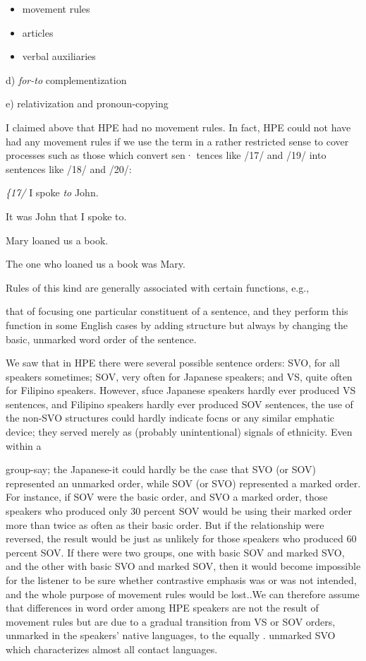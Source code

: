 \begin{itemize}
	\item movement rules
	\item articles
	\item verbal auxiliaries
\end{itemize}

d) \textit{for-to }complementization

e) relativization and pronoun-copying

I claimed above that HPE had no movement rules. In fact, HPE could not have had any movement rules if we use the term in a rather restricted sense to cover processes such as those which convert sen· tences like /17/ and /19/ into sentences like /18/ and /20/:

\textit{\{17}\textit{/ }I spoke \textit{to} John.

\ea\label{ex:18}
It was John that I spoke to.
\glt
\z

\ea\label{ex:19}
Mary loaned us a book.
\glt
\z

\ea\label{ex:20}
The one who loaned us a book was Mary.
\glt
\z

Rules of this kind are generally associated with certain functions, e.g.,


that of focusing one particular constituent of a sentence, and they perform this function in some English cases by adding structure but always by changing the basic, unmarked word order of the sentence.

We saw that in HPE there were several possible sentence orders: SVO, for all speakers sometimes; SOV, very often for Japanese speak\-ers; and VS, quite often for Filipino speakers. However, sfuce Japanese speakers hardly ever produced VS sentences, and Filipino speakers hardly ever produced SOV sentences, the use of the non-SVO structures could hardly indicate focns or any similar emphatic device; they served merely as (probably unintentional) signals of ethnicity. Even within a

group-say; the Japanese-it could hardly be the case that SVO (or SOV) represented an unmarked order, while SOV (or SVO) represented a marked order. For instance, if SOV were the basic order, and SVO a marked order, those speakers who produced only 30 percent SOV would be using their marked order more than twice as often as their basic order. But if the relationship were reversed, the result would be just as unlikely for those speakers who produced 60 percent SOV. If there were two groups, one with basic SOV and marked SVO, and the other with basic SVO and marked SOV, then it would become impossible for the listener to be sure whether contrastive emphasis was or was not intended, and the whole purpose of movement rules would be lost..We can therefore assume that differences in word order among HPE speakers are not the result of movement rules but are due to a gradual transition from VS or SOV orders, unmarked in the speakers' native languages, to the equally . unmarked SVO which characterizes almost all contact languages.


